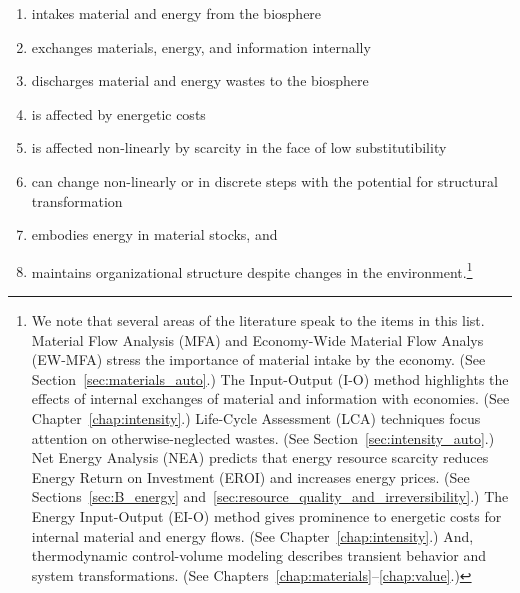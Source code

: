 \begin{enumerate}
	\item{\label{itm:intake}intakes material and energy from the biosphere}
	\item{\label{itm:internal_exchange}exchanges materials, energy, and information internally}
	\item{\label{itm:discharge}discharges material and energy wastes to the biosphere}
	\item{\label{itm:energetic_costs}is affected by energetic costs}
	\item{\label{itm:scarcity}is affected non-linearly by scarcity 
			in the face of low substitutibility}
	\item{\label{itm:non-linear}can change non-linearly or in discrete steps with the potential 
			for structural transformation}
	\item{\label{itm:embodies}embodies energy in material stocks, and}
	\item{\label{itm:robust}maintains organizational structure despite changes 
			in the environment.\footnote{We note that 
				several areas of the literature speak to the items in this list.
				Material Flow Analysis (MFA) and 
				Economy-Wide Material Flow Analys (EW-MFA)
				stress the importance of
				material intake by the economy. 
				(See Section~\ref{sec:materials_auto}.)
				The Input-Output (I-O) method highlights the effects of internal exchanges
				of material and information with economies. 
				(See Chapter~\ref{chap:intensity}.)
				Life-Cycle Assessment (LCA) techniques focus attention 
				on otherwise-neglected wastes. 
				(See Section~\ref{sec:intensity_auto}.)
				Net Energy Analysis (NEA) predicts that energy resource 
				scarcity reduces Energy Return on Investment (EROI)
				and increases energy prices.
				(See Sections~\ref{sec:B_energy} 
				and~\ref{sec:resource_quality_and_irreversibility}.)
				The Energy Input-Output (EI-O) method gives prominence to energetic costs
				for internal material and energy flows.
				(See Chapter~\ref{chap:intensity}.)
				And, thermodynamic control-volume modeling describes
				transient behavior and system transformations.
				(See Chapters~\ref{chap:materials}--\ref{chap:value}.)
			}}
\end{enumerate}

